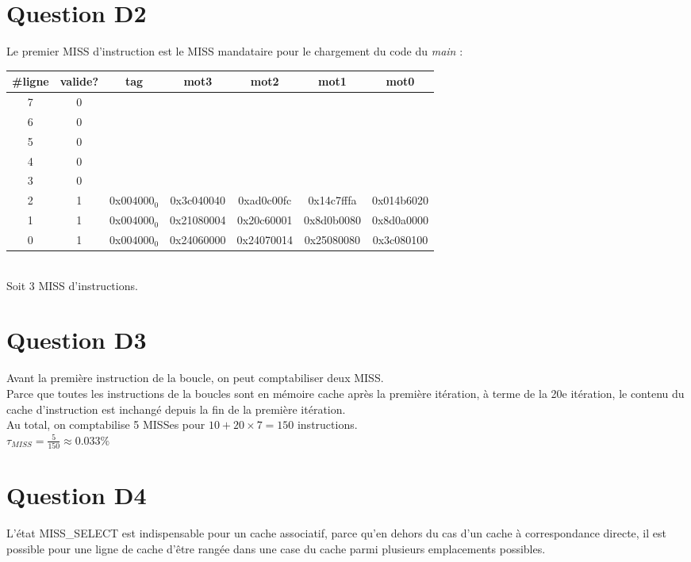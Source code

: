 \documentclass[10pt]{article}
\begin{document}
\section{Question D2}
Le premier MISS d'instruction est le MISS mandataire pour le chargement du code
du {\it main} :

\begin{tabular}{|c|c|c|c|c|c|c|}
  \hline
  \#ligne & valide? & tag & mot3 & mot2 & mot1 & mot0 \\ \hline
  7 & 0 & & & & & \\ \hline
  6 & 0 & & & & & \\ \hline
  5 & 0 & & & & & \\ \hline
  4 & 0 & & & & & \\ \hline
  3 & 0 & & & & & \\ \hline
  2 & 1 & 0x$004000_{0}$ & 0x3c040040 & 0xad0c00fc & 0x14c7fffa & 0x014b6020 \\ \hline
  1 & 1 & 0x$004000_{0}$ & 0x21080004 & 0x20c60001 & 0x8d0b0080 & 0x8d0a0000 \\ \hline
  0 & 1 & 0x$004000_{0}$ & 0x24060000 & 0x24070014 & 0x25080080 & 0x3c080100 \\ \hline
\end{tabular}\\
Soit 3 MISS d'instructions.

\section{Question D3}
Avant la première instruction de la boucle, on peut comptabiliser deux MISS.\\
Parce que toutes les instructions de la boucles sont en mémoire cache après la
première itération, à terme de la 20e itération, le contenu du cache
d'instruction est inchangé depuis la fin de la première itération.\\
Au total, on comptabilise 5 MISSes pour ${10}+{20}\times{7}={150}$
instructions.\\
$\tau_{MISS}=\frac{5}{150}\approx0.033\%$

\section{Question D4}
L'état MISS\_SELECT est indispensable pour un cache associatif, parce qu'en
dehors du cas d'un cache à correspondance directe, il est possible pour une
ligne de cache d'être rangée dans une case du cache parmi plusieurs emplacements
possibles.
\end{document}

